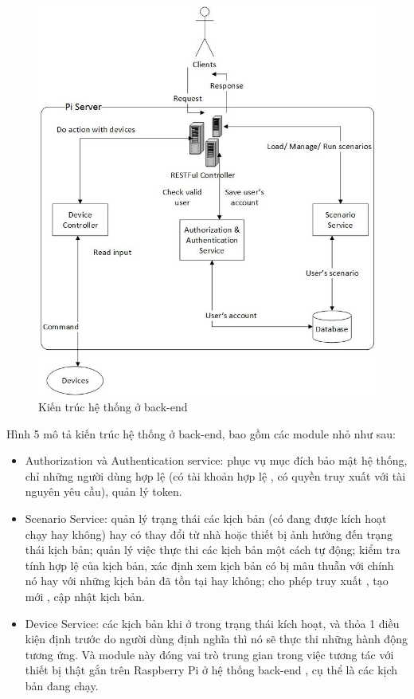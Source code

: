 \documentclass[12pt,a4paper,oneside]{extbook}
\begin{document}
\begin{figure}[h]
  \centering
     \includegraphics[width=15cm]{3-architecture-back-end}
  \caption{Kiến trúc hệ thống ở back-end}\label{fig:3-architecture-back-end}
\end{figure} 

Hình 5 mô tả kiến trúc hệ thống ở back-end, bao gồm các module nhỏ như sau:

\begin{itemize}[topsep=1mm,itemsep=-0.5mm]
\item Authorization và Authentication service: phục vụ mục đích bảo mật hệ thống, chỉ những người dùng hợp lệ (có tài khoản hợp lệ , có quyền truy xuất với tài nguyên yêu cầu), quản lý token.
\item Scenario Service: quản lý trạng thái các kịch bản (có đang được kích hoạt chạy hay không) hay có thay đổi từ nhà hoặc thiết bị ảnh hưởng đến trạng thái kịch bản; quản lý việc thực thi các kịch bản một cách tự động; kiểm tra tính hợp lệ của kịch bản, xác định xem kịch bản có bị mâu thuẫn với chính nó hay với những kịch bản đã tồn tại hay không; cho phép truy xuất , tạo mới , cập nhật kịch bản.
\item Device Service: các kịch bản khi ở trong trạng thái kích hoạt, và thỏa 1 điều kiện định trước do người dùng định nghĩa thì nó sẽ thực thi những hành động tương ứng. Và module này đóng vai trò trung gian trong việc tương tác với thiết bị thật gắn trên Raspberry Pi ở hệ thống back-end , cụ thể là các kịch bản đang chạy.
\vspace{1mm}
\end{itemize}
\end{document}
